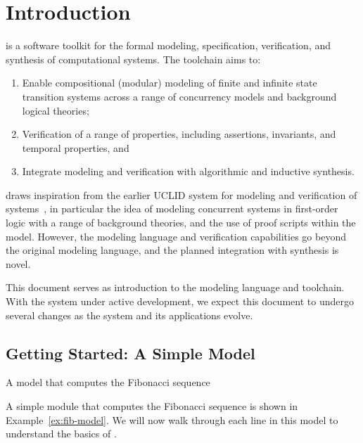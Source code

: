 \chapter{Introduction}

\uclid{} is a software toolkit for the formal modeling, specification,
verification, and synthesis of computational systems. 
The \uclid{} toolchain aims to:
\begin{enumerate}
\item Enable compositional (modular) modeling of finite and infinite state transition systems across a range of concurrency models and background logical theories;
\item Verification of a range of properties, including assertions, invariants, and temporal properties, and %
\item Integrate modeling and verification with algorithmic and inductive synthesis.
\end{enumerate}

\uclid draws inspiration from the earlier {UCLID} system for modeling
and verification of systems~\cite{bryant-cav02,uclid-www}, in particular
the idea of modeling concurrent systems in first-order logic 
with a range of background theories, and the use of proof scripts
within the model. However, the \uclid modeling
language and verification capabilities go beyond the original modeling 
language, and the planned integration with synthesis is novel.

This document serves as introduction to the \uclid{} modeling 
language and toolchain. With the \uclid system under active
development, we expect this document to undergo several changes
as the system and its applications evolve.

\section{Getting Started: A Simple \uclid{} Model}

\begin{uclidlisting}[htbp]
    
    \label{ex:fib-model}
\caption{A \uclid{} model that computes the Fibonacci sequence}
\end{uclidlisting}

A simple \uclid{} module that computes the Fibonacci sequence is shown in Example~\ref{ex:fib-model}.  We will now walk through each line in this model to understand the basics of \uclid{}.

